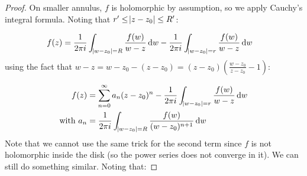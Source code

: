 \begin{proof}
On smaller annulus, $f$ is holomorphic by assumption, so we apply Cauchy's integral formula. Noting that $r' \leq \abs{z-z_0} \leq R'$:








\begin{center}
\end{center}















\begin{align*}
    f(z) &= \frac{1}{2 \pi i} \int_{\abs{w- z_0} = R} \frac{f(w)}{w-z} \dif w - \frac{1}{2 \pi i} \int_{\abs{w- z_0} = r} \frac{f(w)}{w-z} \dif w
\end{align*}
using the fact that $w-z = w-z_0 -(z-z_0) = (z-z_0) \left( \frac{w-z_0}{z-z_0} -1 \right)$:

\begin{align*}
    f(z) &= \sum_{n=0}^\infty a_n (z-z_0)^n - \frac{1}{2 \pi i} \int_{\abs{w- z_0} = r} \frac{f(w)}{w-z} \dif w\\
    \text{with } a_n &= \frac{1}{2 \pi i} \int_{\abs{w- z_0} = R} \frac{f(w)}{(w-z_0)^{n+1}} \dif w
\end{align*}
Note that we cannot use the same trick for the second term since $f$ is not holomorphic inside the disk (so the power series does not converge in it). We can still do something similar. Noting that:



\end{proof}
